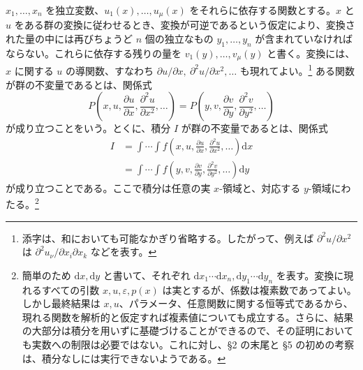 \documentclass[11pt]{article}
\newcommand{\eps}{\varepsilon}
\providecommand{\dd}{\mathrm d}
\providecommand{\p}{\partial}
\begin{document}
\(x_1,\ldots,x_n\) を独立変数、\(u_1(x),\ldots,u_\mu(x)\) をそれらに依存する関数とする。\(x\) と \(u\) をある群の変換に従わせるとき、変換が可逆であるという仮定により、変換された量の中には再びちょうど \(n\) 個の独立なもの \(y_1,\ldots,y_n\) が含まれていなければならない。これらに依存する残りの量を \(v_1(y),\ldots,v_\mu(y)\) と書く。変換には、\(x\) に関する \(u\) の導関数、すなわち \(\p u/\p x,\ \p^2u/\p x^2,\ldots\) も現れてよい。\footnote{添字は、和においても可能なかぎり省略する。したがって、例えば \(\p^2u/\p x^2\) は \(\p^2u_\nu/\p x_i\p x_k\) などを表す。} ある関数が群の不変量であるとは、関係式
\[
P\!\left(x,u,\frac{\p u}{\p x},\frac{\p^2u}{\p x^2},\ldots\right)
 =
P\!\left(y,v,\frac{\p v}{\p y},\frac{\p^2v}{\p y^2},\ldots\right)
\]
が成り立つことをいう。とくに、積分 \(I\) が群の不変量であるとは、関係式
\begin{equation}
\begin{aligned}
I&=\int\!\cdots\!\int f\!\left(x,u,\frac{\p u}{\p x},\frac{\p^2u}{\p x^2},\ldots\right)\dd x\\
 &=\int\!\cdots\!\int f\!\left(y,v,\frac{\p v}{\p y},\frac{\p^2v}{\p y^2},\ldots\right)\dd y
\end{aligned}
\tag{1}
\end{equation}
が成り立つことである。ここで積分は任意の実 \(x\)-領域と、対応する \(y\)-領域にわたる。\footnote{簡単のため \(\dd x,\dd y\) と書いて、それぞれ \(\dd x_1\cdots \dd x_n,\dd y_1\cdots \dd y_n\) を表す。変換に現れるすべての引数 \(x,u,\eps,p(x)\) は実とするが、係数は複素数であってよい。しかし最終結果は \(x,u\)、パラメータ、任意関数に関する恒等式であるから、現れる関数を解析的と仮定すれば複素値についても成立する。さらに、結果の大部分は積分を用いずに基礎づけることができるので、その証明においても実数への制限は必要ではない。これに対し、\S{}2 の末尾と \S{}5 の初めの考察は、積分なしには実行できないようである。}
\end{document}
